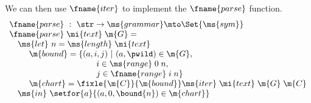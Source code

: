 We can then use $\fname{iter}$ to implement the $\fname{parse}$ function.
\[\begin{array}{l}
\fname{parse} ~:~ \str \uto \ms{grammar} \mto \Set{\ms{sym}}\\
\fname{parse} \;\mi{text} \;\m{G} =\\
\hspace{1em} \ms{let}~ n = \ms{length} \;\mi{text}\\
\hspace{2.375em}\m{bound} =
  \{(a,i,j) ~|~ (a,\pwild) \in \m{G},\\
\hspace{10.5em}i \in \ms{range}\;0\;n, \\
\hspace{10.5em}j\in\fname{range}\;i\;n\}\\
\hspace{2.375em} \m{chart} = \fixle{\m{C}}{\m{bound}}
  \ms{iter} \;\mi{text} \;\m{G} \;\m{C}\\
\hspace{1em}\ms{in}~\setfor{a}{(a, 0, \bound{n}) \in \m{chart}}\\

\end{array}\]
